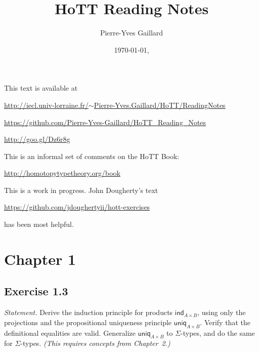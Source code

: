\documentclass[12pt]{article}
\title{HoTT Reading Notes}
\author{Pierre-Yves Gaillard}
\date{\today, \currenttime}
\newcommand{\ind}{\mathsf{ind}}
\newcommand{\nn}{\noindent}
\newcommand{\uniq}{\mathsf{uniq}}
\begin{document}

\maketitle%

\nn This text is available at 

\nn\href{http://iecl.univ-lorraine.fr/~Pierre-Yves.Gaillard/HoTT/ReadingNotes}{http://iecl.univ-lorraine.fr/$\sim$Pierre-Yves.Gaillard/HoTT/ReadingNotes}


\nn\href{https://github.com/Pierre-Yves-Gaillard/HoTT_Reading_Notes}{https://github.com/Pierre-Yves-Gaillard/HoTT\_Reading\_Notes}

\nn\href{http://goo.gl/Dz6r8g}{http://goo.gl/Dz6r8g}

This is an informal set of comments on the HoTT Book:

\nn\href{http://homotopytypetheory.org/book}{http://homotopytypetheory.org/book}

This is a work in progress. John Dougherty's text 

\nn\href{https://github.com/jdoughertyii/hott-exercises}{https://github.com/jdoughertyii/hott-exercises}

\nn has been most helpful.

\tableofcontents%


\section{Chapter 1}

\subsection{Exercise 1.3} 

\emph{Statement.} Derive the induction principle for products $\ind_{A\times B}$, using only the projections and the propositional uniqueness principle $\uniq_{A\times B}$. Verify that the definitional equalities are valid. Generalize $\uniq_{A\times B}$ to $\Sigma$-types, and do the same for $\Sigma$-types. \emph{(This requires concepts from Chapter~2.)}
\end{document}
